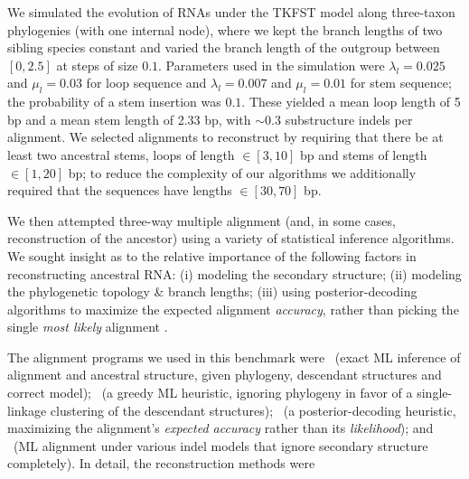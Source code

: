 \documentclass[10pt]{article}
\begin{document}
We simulated the evolution of RNAs under the TKFST model along
three-taxon phylogenies (with one internal node), where we kept the branch lengths of two
sibling species constant and varied the branch length of the
outgroup between $[0, 2.5]$ at steps of size $0.1$.
    Parameters used in the simulation were $\lambda_l = 0.025$ and $\mu_l = 0.03$ for
    loop sequence and $\lambda_l = 0.007$ and $\mu_l = 0.01$ for stem
    sequence; the probability of a stem insertion was $0.1$.  These
    yielded a mean loop length of 5 bp and a mean stem length of 2.33 bp,
    with $\sim 0.3$ substructure indels per alignment.
    We selected alignments to reconstruct by requiring
    that there be at least two ancestral stems, loops of length $\in [3,
    10]$ bp and stems of length $\in [1, 20]$ bp; to reduce the complexity of
    our algorithms we additionally required that the sequences have
    lengths $\in [30, 70]$ bp.

We then attempted three-way multiple alignment (and, in some cases, reconstruction of the ancestor)
using a variety of statistical inference algorithms.
We sought insight as to the relative importance of the following factors in reconstructing ancestral RNA:
(i) modeling the secondary structure;
(ii) modeling the phylogenetic topology \& branch lengths;
(iii) using posterior-decoding algorithms to maximize the expected alignment {\em accuracy},
rather than picking the single {\em most likely} alignment \cite{Holmes98,SchwartzPachter2007,BradleyPachterHolmes2008}.

The alignment programs we used in this benchmark were
\indiegram\ (exact ML inference of alignment and ancestral structure, given phylogeny, descendant structures and correct model);
\stemloc\ (a greedy ML heuristic, ignoring phylogeny in favor of a single-linkage clustering of the descendant structures);
\stemlocama\ (a posterior-decoding heuristic, maximizing the alignment's {\em expected accuracy} rather than its {\em likelihood});
and
\handel\ (ML alignment under various indel models that ignore secondary structure completely).
In detail, the reconstruction methods were
\end{document}
